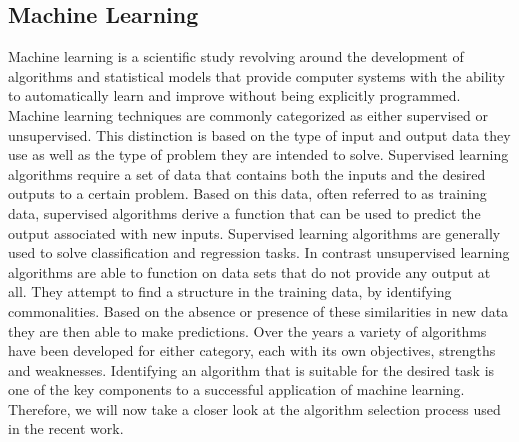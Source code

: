 \subsection{Machine Learning}
Machine learning is a scientific study revolving around the development of algorithms and statistical models that provide computer systems with the ability to automatically learn and improve without being explicitly programmed. Machine learning techniques are commonly categorized as either supervised or unsupervised. This distinction is based on the type of input and output data they use as well as the type of problem they are intended to solve. Supervised learning algorithms require a set of data that contains both the inputs and the desired outputs to a certain problem. Based on this data, often referred to as training data, supervised algorithms derive a function that can be used to predict the output associated with new inputs. Supervised learning algorithms are generally used to solve classification and regression tasks. In contrast unsupervised learning algorithms are able to function on data sets that do not provide any output at all. They attempt to find a structure in the training data, by identifying commonalities. Based on the absence or presence of these similarities in new data they are then able to make predictions. 
Over the years a variety of algorithms have been developed for either category, each with its own objectives, strengths and weaknesses. Identifying an algorithm that is suitable for the desired task is one of the key components to a successful application of machine learning. Therefore, we will now take a closer look at the algorithm selection process used in the recent work. 
  
